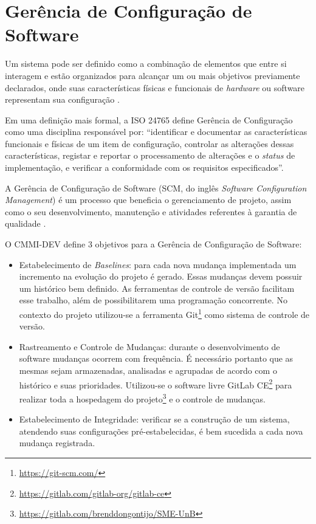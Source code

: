 \chapter{Gerência de Configuração de Software}
Um sistema pode ser definido como a combinação de elementos que entre si interagem e estão organizados para alcançar um ou mais objetivos previamente declarados, onde suas características físicas e funcionais de \textit{hardware} ou software representam sua configuração \cite{SWEBOK2014}.

Em uma definição mais formal, a ISO 24765 \cite{iso_24765} define Gerência de Configuração como uma disciplina responsável por: ``identificar e documentar as características funcionais e físicas de um item de configuração, controlar as alterações dessas características, registar e reportar o processamento de alterações e o \textit{status} de implementação, e verificar a conformidade com os requisitos especificados''.

A Gerência de Configuração de Software (SCM, do inglês \textit{Software Configuration Management}) é um processo que beneficia o gerenciamento de projeto, assim como o seu desenvolvimento, manutenção e atividades referentes à garantia de qualidade \cite{SWEBOK2014}.

O CMMI-DEV \cite{cmmi_dev} define 3 objetivos para a Gerência de Configuração de Software:
\begin{itemize}
    \item Estabelecimento de \textit{Baselines}: para cada nova mudança implementada um incremento na evolução do projeto é gerado. Essas mudanças devem possuir um histórico bem definido. As ferramentas de controle de versão facilitam esse trabalho, além de possibilitarem uma programação concorrente. No contexto do projeto utilizou-se a ferramenta Git\footnote{\url{https://git-scm.com/}} como sistema de controle de versão.
    \item Rastreamento e Controle de Mudanças: durante o desenvolvimento de software mudanças ocorrem com frequência. É necessário portanto que as mesmas sejam armazenadas, analisadas e agrupadas de acordo com o histórico e suas prioridades. Utilizou-se o software livre GitLab CE\footnote{\url{https://gitlab.com/gitlab-org/gitlab-ce}} para realizar toda a hospedagem do projeto\footnote{\url{https://gitlab.com/brenddongontijo/SME-UnB}} e o controle de mudanças.
    \item Estabelecimento de Integridade: verificar se a construção de um sistema, atendendo suas configurações pré-estabelecidas, é bem sucedida a cada nova mudança registrada.
\end{itemize}